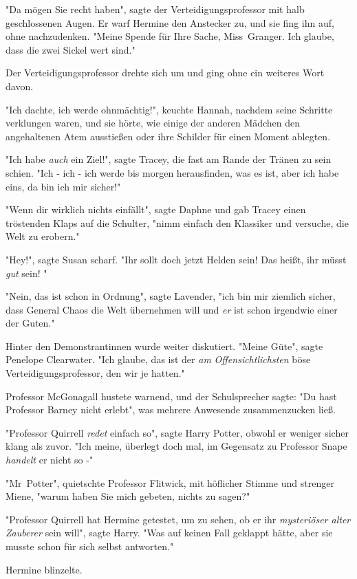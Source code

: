 {"Da mögen Sie recht haben", sagte der Verteidigungsprofessor mit halb geschlossenen Augen. Er warf Hermine den Anstecker zu, und sie fing ihn auf, ohne nachzudenken. "Meine Spende für Ihre Sache, Miss~Granger. Ich glaube, dass die zwei Sickel wert sind."

Der Verteidigungsprofessor drehte sich um und ging ohne ein weiteres Wort davon.

"Ich dachte, ich werde ohnmächtig!", keuchte Hannah, nachdem seine Schritte verklungen waren, und sie hörte, wie einige der anderen Mädchen den angehaltenen Atem ausstießen oder ihre Schilder für einen Moment ablegten.

"Ich habe \emph{auch} ein Ziel!", sagte Tracey, die fast am Rande der Tränen zu sein schien. "Ich - ich - ich werde bis morgen herausfinden, was es ist, aber ich habe eins, da bin ich mir sicher!"

"Wenn dir wirklich nichts einfällt", sagte Daphne und gab Tracey einen tröstenden Klaps auf die Schulter, "nimm einfach den Klassiker und versuche, die Welt zu erobern."

"Hey!", sagte Susan scharf. "Ihr sollt doch jetzt Helden sein! Das heißt, ihr müsst \emph{gut} sein! "

"Nein, das ist schon in Ordnung", sagte Lavender, "ich bin mir ziemlich sicher, dass General Chaos die Welt übernehmen will und \emph{er} ist schon irgendwie einer der Guten."

Hinter den Demonstrantinnen wurde weiter diskutiert. "Meine Güte", sagte Penelope Clearwater. "Ich glaube, das ist der \emph{am} \emph{Offensichtlichsten} böse Verteidigungsprofessor, den wir je hatten."

Professor McGonagall hustete warnend, und der Schulsprecher sagte: "Du hast Professor Barney nicht erlebt", was mehrere Anwesende zusammenzucken ließ.

"Professor Quirrell \emph{redet} einfach so", sagte Harry Potter, obwohl er weniger sicher klang als zuvor. "Ich meine, überlegt doch mal, im Gegensatz zu Professor Snape \emph{handelt} er nicht so -"

"Mr~Potter", quietschte Professor Flitwick, mit höflicher Stimme und strenger Miene, "warum haben Sie mich gebeten, nichts zu sagen?"

"Professor Quirrell hat Hermine getestet, um zu sehen, ob er ihr \emph{mysteriöser alter Zauberer} sein will", sagte Harry. "Was auf keinen Fall geklappt hätte, aber sie musste schon für sich selbst antworten."

Hermine blinzelte.

}
